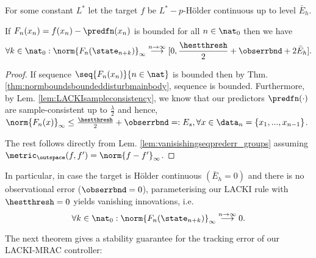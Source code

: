  
\begin{lem} For some constant $L^*$ let the target $f$ be $L^*-p$-H\"older continuous up to level $\bar E_h$. 

If $F_n(x_n) = f(x_n) - \predfn(x_n)$ is bounded for all $ n \in \nat_0$ then we have 
\[\forall k \in \nat_0: \norm{F_n(\state_{n+k})}_\infty \stackrel{n \to \infty}{\longrightarrow} [0, \frac \hestthresh 2 +  \obserrbnd +2\bar E_h]. \] 


\begin{proof}
If sequence $\seq{F_n(x_n)}{n\in \nat} $ is bounded then by Thm. \ref{thm:normboundsboundeddisturbmainbody}, sequence  is bounded. 
Furthermore,
by Lem. \ref{lem:LACKIsampleconsistency}, we know that our predictors $\predfn(\cdot)$ are sample-consistent up to $\frac \lambda 2$ and hence, $\norm{ F_n(x)}_\infty \leq \frac \hestthresh 2 +  \obserrbnd=: E_s ,\forall x \in \data_n=\{x_1,...,x_{n-1}\}$.

The rest follows directly from Lem. \ref{lem:vanisishingseqprederr_groups} assuming $\metric_\outspace (f,f') = \norm{f-f'}_\infty$.
\end{proof}
\label{lem:innovnorm_convergence}
\end{lem}


\begin{remark}
In particular, in case the target is H\"older continuous $(\bar E_h =0)$ and there is no observational error ($\obserrbnd =0$), parameterising our LACKI rule with $\hestthresh =0$ yields vanishing innovations, i.e. 
\[\forall k \in \nat_0: \norm{F_n(\state_{n+k})}_\infty \stackrel{n \to \infty}{\longrightarrow} 0. \]
\end{remark}

The next theorem gives a stability guarantee for the tracking error of our LACKI-MRAC controller:

